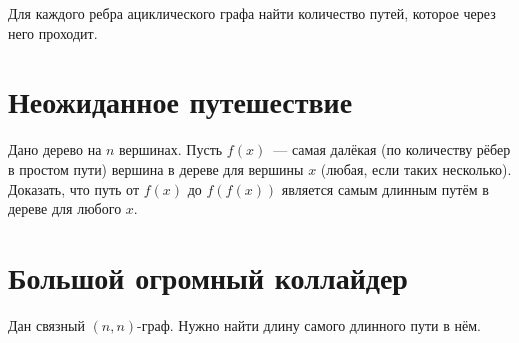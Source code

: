 \documentclass[addpoints]{exam}
\begin{document}
Для каждого ребра ациклического графа найти количество путей, которое через него проходит.

\section{Неожиданное путешествие}

Дано дерево на $n$ вершинах. Пусть $f(x)$~--- самая далёкая (по количеству рёбер в простом пути) вершина в дереве для вершины $x$ (любая, если таких несколько). Доказать, что путь от $f(x)$ до $f(f(x))$ является самым длинным путём в дереве для любого $x$.

\section{Большой огромный коллайдер}

Дан связный $(n,n)$-граф. Нужно найти длину самого длинного пути в нём.
\end{document}
